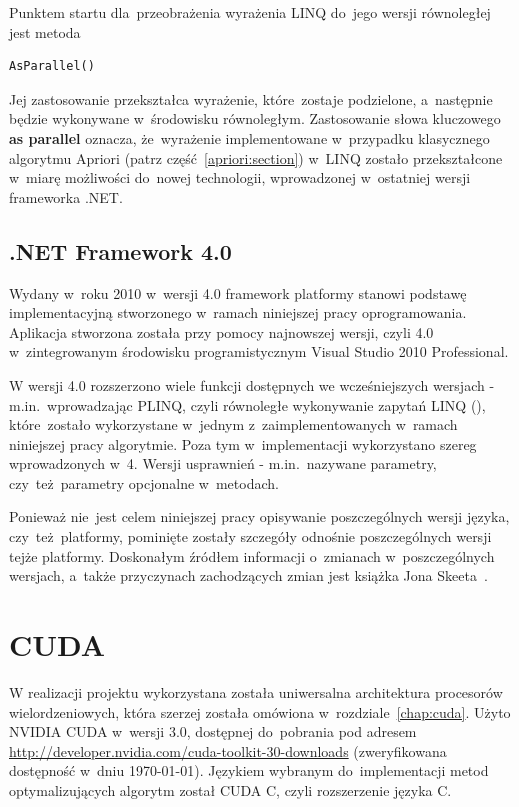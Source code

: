 Punktem startu dla~przeobrażenia wyrażenia LINQ do~jego wersji równoległej jest metoda 

\begin{verbatim}
AsParallel()
\end{verbatim}

Jej zastosowanie przekształca wyrażenie, które~zostaje podzielone, a~następnie będzie wykonywane w~środowisku równoległym. Zastosowanie słowa kluczowego \textbf{as parallel} oznacza, że~wyrażenie implementowane w~przypadku klasycznego algorytmu Apriori (patrz część~\ref{apriori:section}) w~LINQ zostało przekształcone w~miarę możliwości do~nowej technologii, wprowadzonej w~ostatniej wersji frameworka .NET.

\subsection{.NET Framework 4.0}
Wydany w~roku 2010 w~wersji 4.0 framework platformy stanowi podstawę implementacyjną stworzonego w~ramach niniejszej pracy oprogramowania. Aplikacja stworzona została przy pomocy najnowszej wersji, czyli 4.0 w~zintegrowanym środowisku programistycznym Visual Studio 2010 Professional. 

W wersji 4.0 rozszerzono wiele funkcji dostępnych we wcześniejszych wersjach - m.in.~wprowadzając PLINQ, czyli równoległe wykonywanie zapytań LINQ (), które~zostało wykorzystane w~jednym z~zaimplementowanych w~ramach niniejszej pracy algorytmie. Poza tym w~implementacji wykorzystano szereg wprowadzonych w~4. Wersji usprawnień - m.in.~nazywane parametry, czy~też~parametry opcjonalne w~metodach. 

Ponieważ nie~jest celem niniejszej pracy opisywanie poszczególnych wersji języka, czy~też~platformy, pominięte zostały szczegóły odnośnie poszczególnych wersji tejże platformy. Doskonałym źródłem informacji o~zmianach w~poszczególnych wersjach, a~także przyczynach zachodzących zmian jest książka Jona Skeeta~\cite{cSharp:inDepthS}.

\section{CUDA}
W realizacji projektu wykorzystana została uniwersalna architektura procesorów wielordzeniowych, która szerzej została omówiona w~rozdziale~\ref{chap:cuda}. Użyto NVIDIA CUDA w~wersji 3.0, dostępnej do~pobrania pod adresem \url{http://developer.nvidia.com/cuda-toolkit-30-downloads} (zweryfikowana dostępność w~dniu \today). Językiem wybranym do~implementacji metod optymalizujących algorytm został CUDA C, czyli rozszerzenie języka C.

